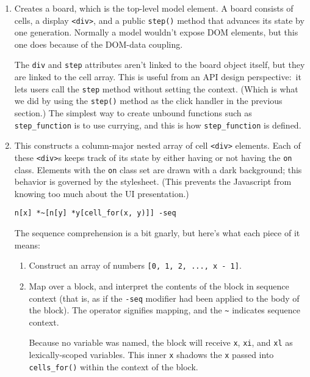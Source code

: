 \documentclass{report}
\begin{document}
\begin{enumerate}
\item[{\tt life\_board(x, y)}]
  Creates a board, which is the top-level model element. A board consists of cells, a display \verb|<div>|, and a public {\tt step()} method that advances its state by one generation.
  Normally a model wouldn't expose DOM elements, but this one does because of the DOM-data coupling.

  The {\tt div} and {\tt step} attributes aren't linked to the board object itself, but they are linked to the cell array. This is useful from an API design perspective:~it lets users
  call the {\tt step} method without setting the context. (Which is what we did by using the {\tt step()} method as the click handler in the previous section.) The simplest way to
  create unbound functions such as \verb|step_function| is to use currying, and this is how \verb|step_function| is defined.

\item[{\tt cells\_for(x, y)}]
  This constructs a column-major nested array of cell \verb|<div>| elements. Each of these \verb|<div>|s keeps track of its state by either having or not having the {\tt on} class.
  Elements with the {\tt on} class set are drawn with a dark background; this behavior is governed by the stylesheet. (This prevents the Javascript from knowing too much about the UI
  presentation.)

\begin{verbatim}
n[x] *~[n[y] *y[cell_for(x, y)]] -seq
\end{verbatim}

  The sequence comprehension is a bit gnarly, but here's what each piece of it means:

\begin{enumerate}
\item[{\tt n[x]}]
  Construct an array of numbers {\tt [0, 1, 2, ..., x - 1]}.

\item[{\tt *\textasciitilde[...]}]
  Map over a block, and interpret the contents of the block in sequence context (that is, as if the {\tt -seq} modifier had been applied to the body of the block). The {\tt *}
  operator signifies mapping, and the {\tt \textasciitilde} indicates sequence context.

  Because no variable was named, the block will receive {\tt x}, {\tt xi}, and {\tt xl} as lexically-scoped variables. This inner {\tt x} shadows the {\tt x} passed into
  \verb|cells_for()| within the context of the block.


\end{enumerate}
\end{enumerate}
\end{document}
